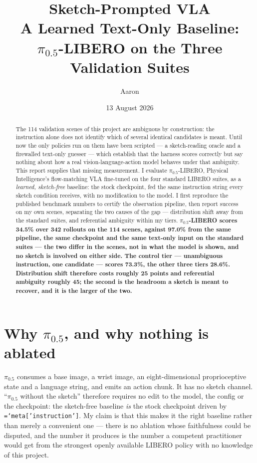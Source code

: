 \documentclass[11pt,a4paper]{article}
\title{\textbf{Sketch-Prompted VLA}\\[2pt]
\large A Learned Text-Only Baseline:\\
$\pi_{0.5}$-LIBERO on the Three Validation Suites}
\author{Aaron}
\date{13 August 2026}
\newcommand{\code}[1]{\texttt{\small\hyphenchar\font=`\-\relax #1}}
\begin{document}
\maketitle

\begin{abstract}
\noindent
The 114 validation scenes of this project are ambiguous by construction: the
instruction alone does not identify which of several identical candidates is
meant. Until now the only policies run on them have been scripted --- a
sketch-reading oracle and a firewalled text-only guesser --- which establish that
the harness scores correctly but say nothing about how a real vision-language-action
model behaves under that ambiguity. This report supplies that missing measurement.
I evaluate $\pi_{0.5}$-LIBERO, Physical Intelligence's flow-matching VLA
fine-tuned on the four standard LIBERO suites, as a \emph{learned, sketch-free}
baseline: the stock checkpoint, fed the same instruction string every sketch
condition receives, with no modification to the model. I first reproduce the
published benchmark numbers to certify the observation pipeline, then report
success on my own scenes, separating the two causes of the gap --- distribution
shift away from the standard suites, and referential ambiguity within my tiers.
\textbf{$\pi_{0.5}$-LIBERO scores 34.5\% over 342 rollouts on the 114 scenes,
against 97.0\% from the same pipeline, the same checkpoint and the same
text-only input on the standard suites --- the two differ in the scenes, not in
what the model is shown, and no sketch is involved on either side. The control tier
--- unambiguous instruction, one candidate --- scores 73.3\%, the other three
tiers 28.6\%. Distribution shift therefore costs roughly 25 points and
referential ambiguity roughly 45; the second is the headroom a sketch is meant
to recover, and it is the larger of the two.}
\end{abstract}

\section{Why $\pi_{0.5}$, and why nothing is ablated}

$\pi_{0.5}$ consumes a base image, a wrist image, an eight-dimensional
proprioceptive state and a language string, and emits an action chunk. It has no
sketch channel. ``$\pi_{0.5}$ without the sketch'' therefore requires no edit to
the model, the config or the checkpoint: the sketch-free baseline \emph{is} the
stock checkpoint driven by \code{meta['instruction']}. My claim is that this
makes it the right baseline rather than merely a convenient one --- there is no
ablation whose faithfulness could be disputed, and the number it produces is the
number a competent practitioner would get from the strongest openly available
LIBERO policy with no knowledge of this project.
\end{document}
